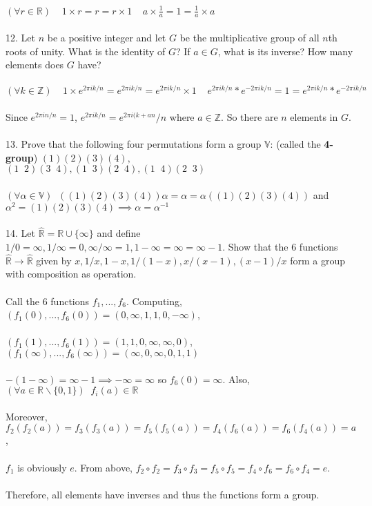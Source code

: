 \documentclass{article}
\begin{document}
\begin{siderules}
\null\qquad \((\forall r\in\mathbb{R})\;\;\;\;1\times r=r=r\times 1\;\;\;\; a\times\frac{1}{a}=1=\frac{1}{a}\times a\)\\\\
\color{blue}12. Let \(n\) be a positive integer and let \(G\) be the multiplicative group of all \(n\)th roots of unity. What is the identity of \(G\)? If \(a\in G\), what is its inverse? How many elements does \(G\) have? \color{black}\\\\
\null\qquad \((\forall k\in\mathbb{Z})\;\;\;\;1\times e^{2\pi ik/n}=e^{2\pi ik/n}=e^{2\pi ik/n}\times 1\;\;\;\; e^{2\pi ik/n}*e^{-2\pi ik/n}=1=e^{2\pi ik/n}*e^{-2\pi ik/n}\)\\\\
\null\qquad Since \(e^{2\pi in/n}=1\), \(e^{2\pi ik/n}=e^{2\pi i(k+an}/n\) where \(a\in\mathbb{Z}\). So there are \(n\) elements in \(G\).\\\\
\color{blue}13. Prove that the following four permutations form a group \(\mathbb{V}\): (called the \textbf{4-group}) 
\((1)(2)(3)(4), \)\\\((1\;\;2)(3\;\;4), (1\;\;3)(2\;\;4), (1\;\;4)(2\;\;3)\)\\\\\color{black}
\null\qquad \((\forall \alpha\in\mathbb{V})\;\; ((1)(2)(3)(4))\alpha=\alpha=\alpha((1)(2)(3)(4))\) and \(\alpha^{2}=(1)(2)(3)(4)\implies\alpha=\alpha^{-1}\)\\\\
\color{blue} 14. Let \(\hat{\mathbb{R}}=\mathbb{R}\cup\{\infty\}\) and define \(1/0=\infty, 1/\infty=0, \infty/\infty=1, 1-\infty=\infty=\infty-1\). Show that the 6 functions \(\hat{\mathbb{R}}\to\hat{\mathbb{R}}\) given by \(x,1/x,1-x,1/(1-x),x/(x-1),(x-1)/x\) form a group with composition as operation.\color{black}\\\\
\null\qquad Call the 6 functions \(f_{1}, ...,f_{6}\). Computing, \((f_{1}(0),...,f_{6}(0))=(0,\infty,1,1,0,-\infty)\), \\\\
\null\qquad \((f_{1}(1),...,f_{6}(1))=(1,1,0,\infty,\infty,0)\), \((f_{1}(\infty),...,f_{6}(\infty))=(\infty,0,\infty,0,1,1)\)\\\\
\null\qquad \(-(1-\infty)=\infty-1\implies -\infty=\infty\) so \(f_{6}(0)=\infty\). Also, \((\forall a\in\mathbb{R} \backslash\{0,1\})\;\; f_{i}(a)\in\mathbb{R}\)\\\\
\null\qquad Moreover, \(f_{2}(f_{2}(a))=f_{3}(f_{3}(a))=f_{5}(f_{5}(a))=f_{4}(f_{6}(a))=f_{6}(f_{4}(a))=a\),\\\\
\null\qquad \(f_{1}\) is obviously \(e\). From above, \(f_{2}\circ f_{2}=f_{3}\circ f_{3}=f_{5}\circ f_{5}=f_{4}\circ f_{6}=f_{6}\circ f_{4}=e\).\\\\
\null\qquad Therefore, all elements have inverses and thus the functions form a group.
\end{siderules}
\end{document}
